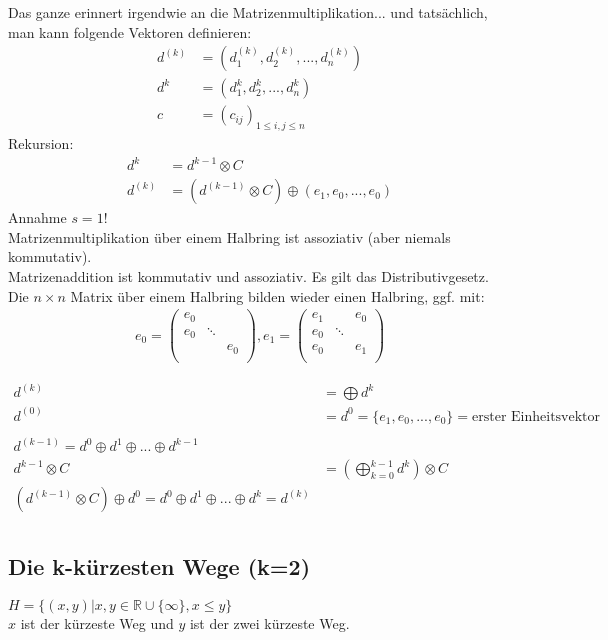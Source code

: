 Das ganze erinnert irgendwie an die Matrizenmultiplikation... und tatsächlich, man kann folgende Vektoren definieren:\\
\begin{align*}
d^{(k)} &= (d_1^{(k)},d_2^{(k)},...,d_n^{(k)})\\
d^{k} &= (d_1^{k},d_2^{k},...,d_n^{k})\\
c &= (c_{ij})_{1\leq i,j \leq n}
\end{align*}
Rekursion:
\begin{align*}
d^k &= d^{k-1} \otimes C\\
d^{(k)} &= (d^{(k-1)} \otimes C) \oplus (e_1,e_0,...,e_0)
\end{align*}
Annahme $s=1$!\\
Matrizenmultiplikation über einem Halbring ist assoziativ (aber niemals kommutativ).\\
Matrizenaddition ist kommutativ und assoziativ. Es gilt das Distributivgesetz.\\
Die $n \times n$ Matrix über einem Halbring bilden wieder einen Halbring, ggf. mit:\\
\begin{align*}
e_0 =
\begin{pmatrix}
e_0 & &\\
e_0 &\ddots &\\
 & &e_0\\
\end{pmatrix}
, e_1= \begin{pmatrix}
e_1 & & e_0\\
e_0 &\ddots &\\
e_0 & &e_1\\
\end{pmatrix}
\end{align*}

\begin{align*}
d^{(k)} &= \bigoplus d^k\\
d^{(0)} &= d^0 = \{e_1,e_0,...,e_0\} = \text{erster Einheitsvektor}\\
\\
d^{(k-1)} = d^0 \oplus d^1 \oplus ... \oplus d^{k-1}\\
d^{k-1} \otimes C &= (\bigoplus_{k=0}^{k-1} d^k) \otimes C\\
(d^{(k-1)} \otimes C) \oplus d^0 = d^0 \oplus d^1 \oplus ... \oplus d^k = d^{(k)}\\
\end{align*}

\subsection{Die k-kürzesten Wege (k=2)}
$H = \{ (x,y) | x,y \in \mathbb{R} \cup \{\infty\}, x \leq y\}$\\
$x$ ist der kürzeste Weg und $y$ ist der zwei kürzeste Weg.\\

